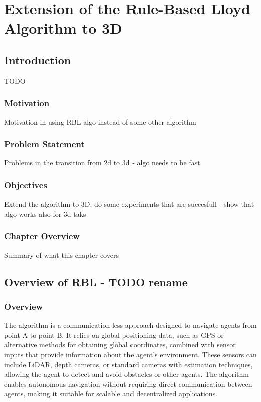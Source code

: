 \chapter{Extension of the Rule-Based Lloyd Algorithm to 3D\label{chap:rbl}}
\section{Introduction}
    TODO
    \subsection{Motivation}
        Motivation in using RBL algo instead of some other algorithm
    \subsection{Problem Statement}
        Problems in the transition from 2d to 3d - algo needs to be fast 
    \subsection{Objectives}
        Extend the algorithm to 3D, do some experiments that are succesfull - show that algo works also for 3d taks
    \subsection{Chapter Overview}
        Summary of what this chapter covers

\section{Overview of RBL - TODO rename}

    \subsection{Overview}        
        The algorithm is a communication-less approach designed to navigate agents from point A to point B. 
        It relies on global positioning data, such as GPS or alternative methods for obtaining global coordinates, combined with sensor inputs that provide information about the agent's environment. 
        These sensors can include LiDAR, depth cameras, or standard cameras with estimation techniques, allowing the agent to detect and avoid obstacles or other agents. 
        The algorithm enables autonomous navigation without requiring direct communication between agents, making it suitable for scalable and decentralized applications.

